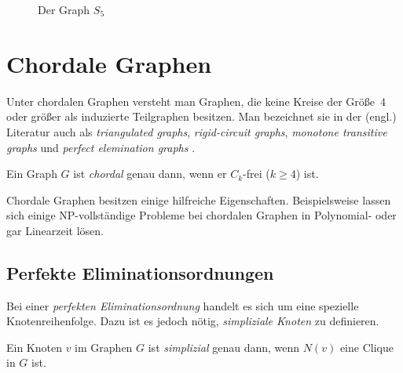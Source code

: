 \begin{figure}[htb]
\centering
{}
\caption{Der Graph $S_5$}
\label{pic:bsp_Sun}
\end{figure}

\section{Chordale Graphen}\label{sec:chordalGraphs}
Unter chordalen Graphen versteht man Graphen, die keine Kreise der Größe~$4$ oder größer als induzierte Teilgraphen besitzen. 
Man bezeichnet sie in der (engl.) Literatur auch als \emph{triangulated graphs}, \emph{rigid-circuit graphs}, \emph{monotone transitive graphs} und \emph{perfect elemination graphs} \cite{brandstaedt1999graph}.

\begin{mydef}
    Ein Graph $G$ ist \emph{chordal} genau dann, wenn er $C_k$-frei ($k\geq4$) ist.
\end{mydef}

Chordale Graphen besitzen einige hilfreiche Eigenschaften. Beispielsweise lassen sich einige NP-vollständige Probleme bei chordalen Graphen in Polynomial- oder gar Linearzeit lösen.

\subsection{Perfekte Eliminationsordnungen}
Bei einer \emph{perfekten Eliminationsordnung} handelt es sich um eine spezielle Knotenreihenfolge. Dazu ist es jedoch nötig, \emph{simpliziale Knoten} zu definieren.

\begin{mydef}
    Ein Knoten $v$ im Graphen $G$ ist \emph{simplizial} genau dann, wenn $N(v)$ eine Clique in $G$ ist.
\end{mydef}

